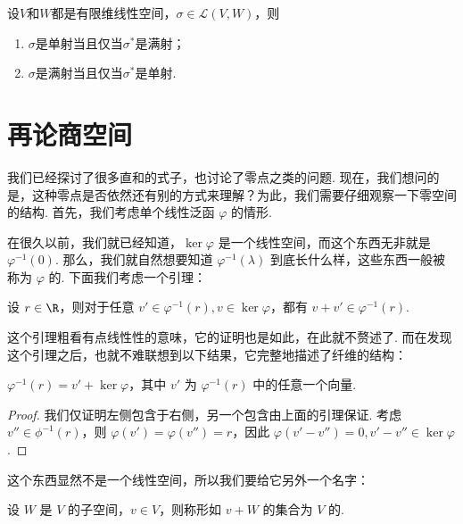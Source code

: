 \begin{corollary}{}{}
    设$V$和$W$都是有限维线性空间，$\sigma\in\mathcal{L}(V,W)$，则
    \begin{enumerate}
        \item $\sigma$是单射当且仅当$\sigma^*$是满射；

        \item $\sigma$是满射当且仅当$\sigma^*$是单射.
    \end{enumerate}
\end{corollary}

\section{再论商空间}

我们已经探讨了很多直和的式子，也讨论了零点之类的问题. 现在，我们想问的是，这种零点是否依然还有别的方式来理解？为此，我们需要仔细观察一下零空间的结构. 首先，我们考虑单个线性泛函 $\varphi$ 的情形.

在很久以前，我们就已经知道，$\ker \varphi$ 是一个线性空间，而这个东西无非就是 $\varphi^{-1} (0)$. 那么，我们就自然想要知道 $\varphi^{-1} (\lambda)$ 到底长什么样，这些东西一般被称为 $\varphi$ 的. 下面我们考虑一个引理：

\begin{lemma}{}{}
    设 $r \in \R$，则对于任意 $v' \in \varphi^{-1}(r), v \in \ker \varphi$，都有 $v + v' \in \varphi^{-1} (r)$.
\end{lemma}

这个引理粗看有点线性性的意味，它的证明也是如此，在此就不赘述了. 而在发现这个引理之后，也就不难联想到以下结果，它完整地描述了纤维的结构：

\begin{theorem}{}{}
    $\varphi^{-1} (r) = v' + \ker \varphi$，其中 $v'$ 为 $\varphi^{-1} (r)$ 中的任意一个向量.
\end{theorem}

\begin{proof}
    我们仅证明左侧包含于右侧，另一个包含由上面的引理保证. 考虑 $v'' \in \phi^{-1} (r)$，则 $\varphi (v') = \varphi (v'') = r$，因此 $\varphi(v' - v'') = 0, v' - v'' \in \ker \varphi$.
\end{proof}

这个东西显然不是一个线性空间，所以我们要给它另外一个名字：

\begin{definition}{}{}
    设 $W$ 是 $V$ 的子空间，$v \in V$，则称形如 $v + W$ 的集合为 $V$ 的.
\end{definition}

